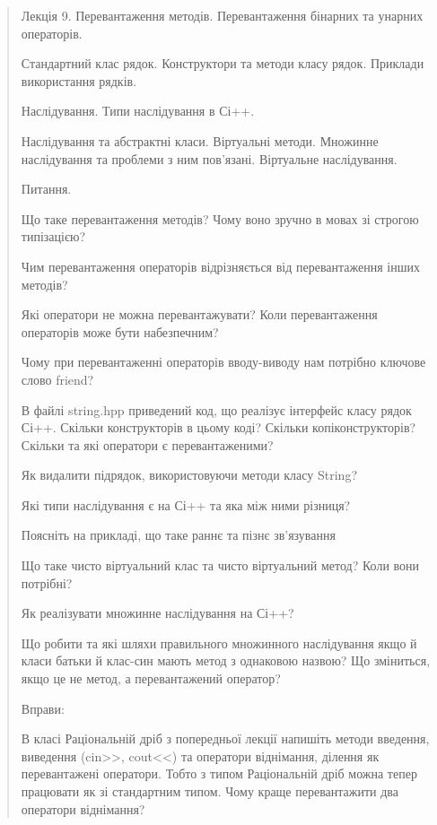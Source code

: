 \documentclass[]{article}
\begin{document}
\begin{quote}
\protect\hypertarget{_Hlk54461599}{}{}

Лекція 9. Перевантаження методів. Перевантаження бінарних та унарних
операторів.

Стандартний клас рядок. Конструктори та методи класу рядок. Приклади
використання рядків.

Наслідування. Типи наслідування в Сі++.

Наслідування та абстрактні класи. Віртуальні методи. Множинне
наслідування та проблеми з ним пов'язані. Віртуальне наслідування.

Питання.

\protect\hypertarget{_Hlk57988736}{}{}Що таке перевантаження методів?
Чому воно зручно в мовах зі строгою типізацією?

Чим перевантаження операторів відрізняється від перевантаження інших
методів?

Які оператори не можна перевантажувати? Коли перевантаження операторів
може бути набезпечним?

Чому при перевантаженні операторів вводу-виводу нам потрібно ключове
слово friend?

В файлі string.hpp приведений код, що реалізує інтерфейс класу рядок
Сі++. Скільки конструкторів в цьому коді? Скільки копіконструкторів?
Скільки та які оператори є перевантаженими?

Як видалити підрядок, використовуючи методи класу String?

Які типи наслідування є на Сі++ та яка між ними різниця?

Поясніть на прикладі, що таке раннє та пізнє зв'язування

Що таке чисто віртуальний клас та чисто віртуальний метод? Коли вони
потрібні?

Як реалізувати множинне наслідування на Сі++?

Що робити та які шляхи правильного множинного наслідування якщо й класи
батьки й клас-син мають метод з однаковою назвою? Що зміниться, якщо це
не метод, а перевантажений оператор?

Вправи:

\protect\hypertarget{_Hlk65951582}{}{}В класі Раціональній дріб з
попередньої лекції напишіть методи введення, виведення
(cin\textgreater{}\textgreater{}, cout\textless{}\textless{}) та
оператори віднімання, ділення як перевантажені оператори. Тобто з типом
Раціональній дріб можна тепер працювати як зі стандартним типом. Чому
краще перевантажити два оператори віднімання?


\end{quote}
\end{document}
